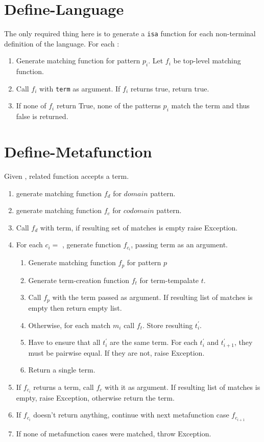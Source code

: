 \section{Define-Language}

The only required thing here is to generate a \texttt{isa} function for each non-terminal definition of the language. For each \NtDefinition:
\begin{enumerate}
\item Generate matching function for pattern $p_i$. Let $f_i$ be top-level matching function.
\item Call $f_i$ with \texttt{term} as argument. If $f_i$ returns true, return true.
\item If none of $f_i$ return True, none of the patterns $p_i$ match the term and thus false is returned.
\end{enumerate}



\section{Define-Metafunction}

Given \DefineMetafunction, related function accepts a term.

\begin{enumerate}
\item generate matching function $f_d$ for $domain$ pattern.
\item generate matching function $f_c$ for $codomain$ pattern.
\item Call $f_d$ with term, if resulting set of matches is empty raise Exception.
\item For each $c_i =$ \MetafunctionCase, generate function $f_{c_i}$, passing term as an argument.
\begin{enumerate}
	\item Generate matching function $f_{p}$ for pattern $p$
	\item Generate term-creation function $f_t$ for term-tempalate $t$.
	\item Call $f_p$ with the term passed as argument. If resulting list of matches is empty then return empty list.
	\item Otherwise, for each match $m_i$ call $f_t$. Store resulting $t_i^\prime$.
	\item Have to ensure that all $t_i^\prime$ are the same term. For each $t_i^\prime$ and $t_{i+1}^\prime$, they must be pairwise equal. If they are not, raise Exception.
	\item Return a single term.
\end{enumerate}
\item If $f_{c_i}$ returns a term, call $f_c$ with it as argument. If resulting list of matches is empty, raise Exception, otherwise return the term.
\item If $f_{c_i}$ doesn't return anything, continue with next metafunction case $f_{c_{i+1}}$
\item If none of metafunction cases were matched, throw Exception.
\end{enumerate}

